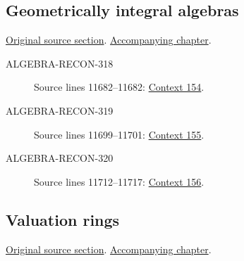 \subsection{Geometrically integral algebras}
\hypertarget{algebra-source-section-geometrically-integral}{}
\noindent\href{https://github.com/stacks/stacks-project/blob/a04446e57ec1fbc252a871afcec7752fb2807b14/algebra.tex\#L11654}{Original source section}. \href{algebra.pdf\#nameddest=section-geometrically-integral}{Accompanying chapter}.

\begin{description}
\item[ALGEBRA-RECON-318] Source lines 11682--11682: \hyperlink{algebra-context-154}{Context 154}.
\item[ALGEBRA-RECON-319] Source lines 11699--11701: \hyperlink{algebra-context-155}{Context 155}.
\item[ALGEBRA-RECON-320] Source lines 11712--11717: \hyperlink{algebra-context-156}{Context 156}.
\end{description}

\subsection{Valuation rings}
\hypertarget{algebra-source-section-valuation-rings}{}
\noindent\href{https://github.com/stacks/stacks-project/blob/a04446e57ec1fbc252a871afcec7752fb2807b14/algebra.tex\#L11723}{Original source section}. \href{algebra.pdf\#nameddest=section-valuation-rings}{Accompanying chapter}.

